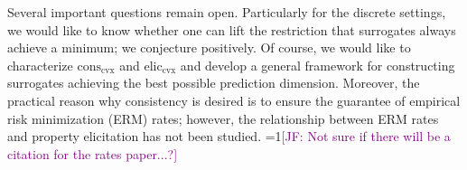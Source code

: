 \documentclass[11pt]{article} %
\newcommand{\Comments}{1}
\newcommand{\mynote}[2]{\ifnum\Comments=1\textcolor{#1}{#2}\fi}
\newcommand{\jessie}[1]{\mynote{purple}{[JF: #1]}}
\newcommand{\reals}{\mathbb{R}}
\newcommand{\eliccvx}{\mathrm{elic}_\mathrm{cvx}}
\newcommand{\conscvx}{\mathrm{cons}_\mathrm{cvx}}
\newcommand{\Y}{\mathcal{Y}}
\begin{document}
Several important questions remain open.
Particularly for the discrete settings, we would like to know whether one can lift the restriction that surrogates always achieve a minimum; we conjecture positively.
Of course, we would like to characterize $\conscvx$ and $\eliccvx$ and develop a general framework for constructing surrogates achieving the best possible prediction dimension.
Moreover, the practical reason why consistency is desired is to ensure the guarantee of empirical risk minimization (ERM) rates; however, the relationship between ERM rates and property elicitation has not been studied.
\jessie{Not sure if there will be a citation for the rates paper...?}

\newpage
\end{document}
